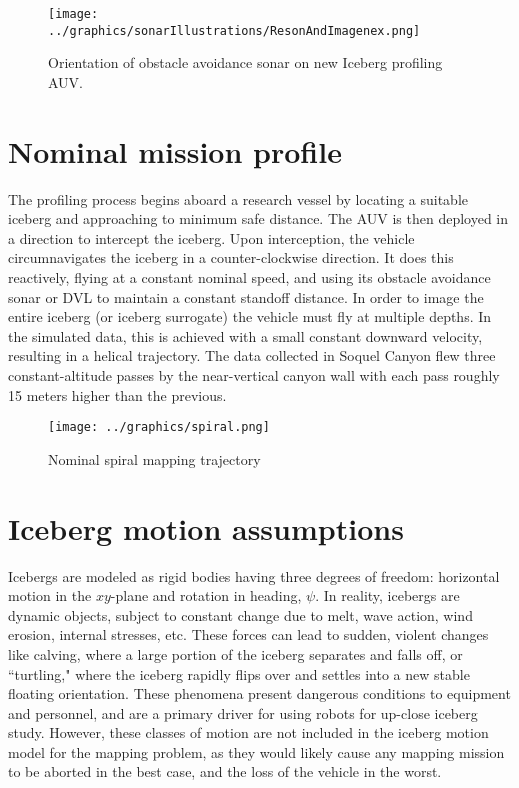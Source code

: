 \begin{figure}[htb]
   \centering
   \texttt{[image: ../graphics/sonarIllustrations/ResonAndImagenex.png]} %
   \caption{Orientation of obstacle avoidance sonar on new Iceberg profiling AUV. }
   \label{fig:ObstandMulti}
\end{figure}

\section{Nominal mission profile}

The profiling process begins aboard a research vessel by locating a suitable iceberg and approaching to minimum safe distance. The AUV is then deployed in a direction to intercept the iceberg. Upon interception, the vehicle circumnavigates the iceberg in a counter-clockwise direction. It does this reactively, flying at a constant nominal speed, and using its obstacle avoidance sonar or DVL to maintain a constant standoff distance. In order to image the entire iceberg (or iceberg surrogate) the vehicle must fly at multiple depths. In the simulated data, this is achieved with a small constant downward velocity, resulting in a helical trajectory. The data collected in Soquel Canyon flew three constant-altitude passes by the near-vertical canyon wall with each pass roughly 15 meters higher than the previous. 

\begin{figure}[htb]
   \centering
   \texttt{[image: ../graphics/spiral.png]} %
   \caption{Nominal spiral mapping trajectory }
   \label{fig:NominalProfile}
\end{figure}

\section{Iceberg motion assumptions}

Icebergs are modeled as rigid bodies having three degrees of freedom: horizontal motion in the $xy$-plane and rotation in heading, $\psi$. In reality, icebergs are dynamic objects, subject to constant change due to melt, wave action, wind erosion, internal stresses, etc. These forces can lead to sudden, violent changes like calving, where a large portion of the iceberg separates and falls off, or ``turtling," where the iceberg rapidly flips over and settles into a new stable floating orientation. These phenomena present dangerous conditions to equipment and personnel, and are a primary driver for using robots for up-close iceberg study.  However, these classes of motion are not included in the iceberg motion model for the mapping problem, as they would likely cause any mapping mission to be aborted in the best case, and the loss of the vehicle in the worst.

